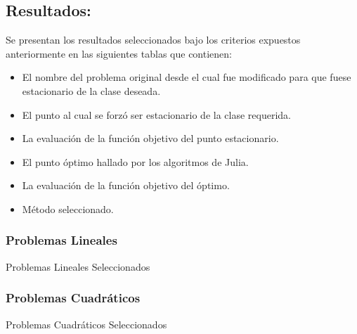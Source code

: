 \subsection{Resultados:}
Se presentan los resultados seleccionados bajo los criterios expuestos anteriormente en las siguientes tablas que contienen:
\begin{itemize}
    \item El nombre del problema original desde el cual fue modificado para que fuese estacionario de la clase deseada. 
    \item El punto al cual se forzó ser estacionario de la clase requerida.
    \item La evaluación de la función objetivo del punto estacionario.
    \item El punto óptimo hallado por los algoritmos de Julia.
    \item La evaluación de la función objetivo del óptimo.
    \item Método seleccionado.
\end{itemize}

\subsubsection{Problemas Lineales} 
\begin{resultstable}{Problemas Lineales Seleccionados}
    \end{resultstable}



\subsubsection{Problemas Cuadráticos}

\begin{resultstable}{Problemas Cuadráticos Seleccionados}
\end{resultstable}

